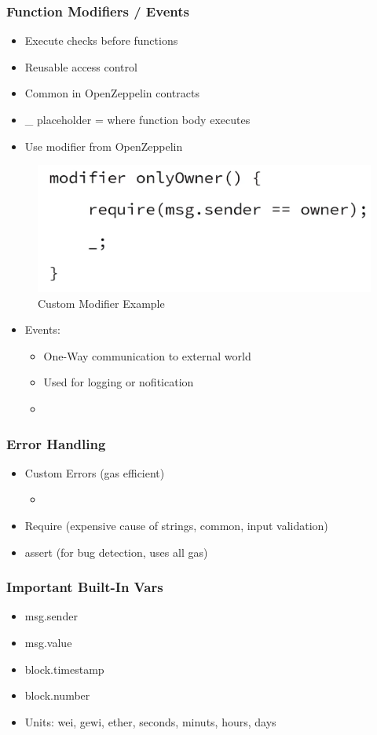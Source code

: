 \documentclass[../Main.tex]{subfiles}
\begin{document}
\subsubsection{Function Modifiers / Events}
\begin{itemize}
    \item Execute checks before functions
    \item Reusable access control
    \item Common in OpenZeppelin contracts
    \item \_\; placeholder = where function body executes
    \item Use modifier from OpenZeppelin
\end{itemize}
\begin{figure}[H]
    \centering
    \includegraphics[width=0.75\linewidth]{Images/blockchain/sol-modifier-example.png}
    \caption{Custom Modifier Example}
\end{figure}
\begin{itemize}
    \item Events:
    \begin{itemize}
        \item One-Way communication to external world
        \item Used for logging or nofitication
        \item 
    \end{itemize}
\end{itemize}
\subsubsection{Error Handling}
\begin{itemize}
    \item Custom Errors (gas efficient)
    \begin{itemize}
        \item 
    \end{itemize}
    \item Require (expensive cause of strings, common, input validation)
    \item assert (for bug detection, uses all gas)
\end{itemize}

\subsubsection{Important Built-In Vars}
\begin{itemize}
    \item msg.sender
    \item msg.value
    \item block.timestamp
    \item block.number
    \item Units: wei, gewi, ether, seconds, minuts, hours, days
\end{itemize}
\end{document}
